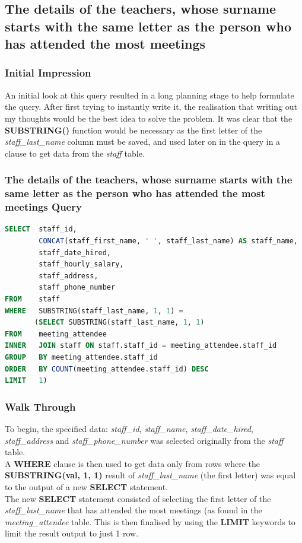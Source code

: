 \documentclass{article}
\begin{document}
\subsection{The details of the teachers, whose surname starts with the same letter as the person who has attended the most meetings}
\subsubsection{Initial Impression} An initial look at this query resulted in a long planning stage to help formulate the query. After first trying to instantly write it, the realisation that writing out my thoughts would be the best idea to solve the problem. It was clear that the \textbf{SUBSTRING()} function would be necessary as the first letter of the \textit{staff\_last\_name} column must be saved, and used later on in the query in a clause to get data from the \textit{staff} table.


\subsubsection{The details of the teachers, whose surname starts with the same letter as the person who has attended the most meetings Query}
\begin{lstlisting}[language=sql, caption=The details of the teachers whose surname starts with the same letter as the person who has attended the most meetings, style=mystyle]
SELECT  staff_id,
        CONCAT(staff_first_name, ' ', staff_last_name) AS staff_name,
        staff_date_hired,
        staff_hourly_salary,
        staff_address,
        staff_phone_number
FROM    staff
WHERE   SUBSTRING(staff_last_name, 1, 1) =
       (SELECT SUBSTRING(staff_last_name, 1, 1)
FROM    meeting_attendee
INNER   JOIN staff ON staff.staff_id = meeting_attendee.staff_id
GROUP   BY meeting_attendee.staff_id
ORDER   BY COUNT(meeting_attendee.staff_id) DESC
LIMIT   1)
\end{lstlisting} 
\subsubsection{Walk Through} To begin, the specified data: \textit{staff\_id}, \textit{staff\_name}, \textit{staff\_date\_hired}, \textit{staff\_address} and \textit{staff\_phone\_number} was selected originally from the \textit{staff} table.
\\\newline
A \textbf{WHERE} clause is then used to get data only from rows where the \textbf{SUBSTRING(val, 1, 1)} result of \textit{staff\_last\_name} (the first letter) was equal to the output of a new \textbf{SELECT} statement.
\\\newline
The new \textbf{SELECT} statement consisted of selecting the first letter of the \textit{staff\_last\_name} that has attended the most meetings (as found in the \textit{meeting\_attendee} table. This is then finalised by using the \textbf{LIMIT} keywords to limit the result output to just 1 row.
\end{document}
